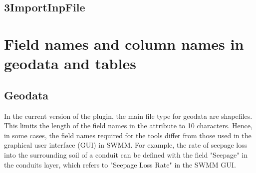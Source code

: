 \documentclass[10pt,a4paper,oneside]{scrbook}
\begin{document}
\section{3\textunderscore ImportInpFile}

\chapter{Field names and column names in geodata and tables}

\section{Geodata}
In the current version of the plugin, the main file type for geodata are shapefiles. This limits the length of the field names in the attribute to 10 characters. Hence, in some cases, the field names required for the tools differ from those used in the graphical user interface (GUI) in SWMM. For example, the rate of seepage loss into the surrounding soil of a conduit can be defined with the field "Seepage" in the conduits layer, which refers to "Seepage Loss Rate" in the SWMM GUI. %
\end{document}
